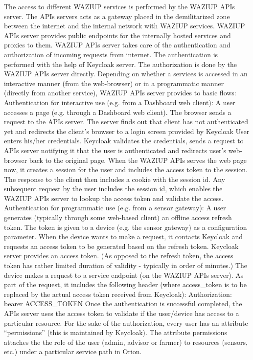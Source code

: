 The access to different WAZIUP services is performed by the WAZIUP APIs server. The APIs servers acts as a gateway placed in the demilitarized zone between the internet and the internal network with WAZIUP services. WAZIUP APIs server provides public endpoints for the internally hosted services and proxies to them. 
WAZIUP APIs server takes care of the authentication and authorization of incoming requests from internet. The authentication is performed with the help of Keycloak server. The authorization is done by the WAZIUP APIs server directly.
Depending on whether a services is accessed in an interactive manner (from the web-browser) or in a programmatic manner (directly from another service), WAZIUP APIs server provides to basic flows:
Authentication for interactive use (e.g. from a Dashboard web client):
A user accesses a page (e.g. through a Dashboard web client). The browser sends a request to the APIs server.
The server finds out that client has not authenticated yet and redirects the client’s browser to a login screen provided by Keycloak
User enters his/her credentials.
Keycloak validates the credentials, sends a request to APIs server notifying it that the user is authenticated and redirects user’s web-browser back to the original page.
When the WAZIUP APIs serves the web page now, it creates a session for the user and includes the access token to the session. The response to the client then includes a cookie with the session id.
Any subsequent request by the user includes the session id, which enables the WAZIUP APIs server to lookup the access token and validate the access.
Authentication for programmatic use (e.g. from a sensor gateway):
A user generates (typically through some web-based client) an offline access refresh token. The token is given to a device (e.g. the sensor gateway) as a configuration parameter.
When the device wants to make a request, it contacts Keycloak and requests an access token to be generated based on the refresh token.
Keycloak server provides an access token. (As opposed to the refresh token, the access token has rather limited duration of validity - typically in order of minutes.)
The device makes a request to a service endpoint (on the WAZIUP APIs server). As part of the request, it includes the following header (where access_token is to be replaced by the actual access token received from Keycloak):
Authorization: bearer ACCESS_TOKEN
Once the authentication is successful completed, the APIs server uses the access token to validate if the user/device has access to a particular resource.
For the sake of the authorization, every user has an attribute “permissions” (this is maintained by Keycloak). The attribute permissions attaches the the role of the user (admin, advisor or farmer) to resources (sensors, etc.) under a particular service path in Orion.

